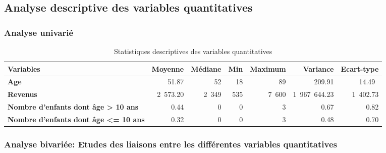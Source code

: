 \documentclass[11pt,a4paper, x11names]{article}\usepackage[]{graphicx}\usepackage[]{color}
\begin{document}
\subsection{Analyse descriptive des variables quantitatives }
\subsubsection{Analyse univarié}

\begin{table}[!h] \centering
\begin{small}
\begin{tabular}{@{}lrrrrrr@{}}\toprule
\textbf{Variables}& \textbf{Moyenne} & \textbf{Médiane}& \textbf{Min} & \textbf{Maximum} & \textbf{Variance} & \textbf{Ecart-type} \\ \midrule
\textbf{Age}          & 51.87 &  52 & 18 & 89 & 209.91 & 14.49\ \\ \hdashline
\textbf{Revenus}      & 2~573.20 & 2~349 & 535&7~600 & 1~967~644.23&1~402.73   \\ \hdashline
\textbf{Nombre d'enfants dont âge > 10 ans} &  0.44 & 0 & 0 & 3 & 0.67 & 0.82  \\  \hdashline
\textbf{Nombre d'enfants dont âge <= 10 ans} &  0.32 & 0 & 0 & 3 & 0.48 & 0.70 \\  
\bottomrule
\end{tabular}
\end{small}
\caption{Statistiques descriptives des variables quantitatives}
\end{table}



\subsubsection{Analyse bivariée: Etudes des liaisons entre les différentes variables quantitatives}
\end{document}
